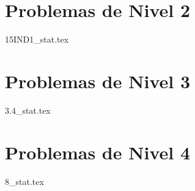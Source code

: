 \section{Problemas de Nivel 2}
{15IND1_stat.tex} %

\section{Problemas de Nivel 3}
{3.4_stat.tex} %

\section{Problemas de Nivel 4}
{8_stat.tex} %